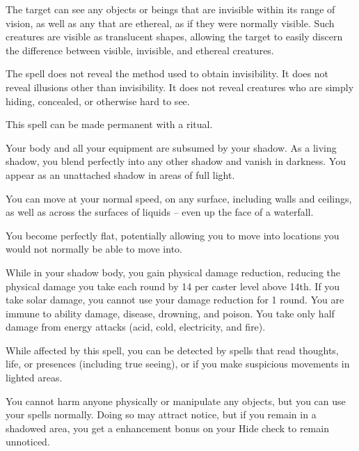 \begin{spellheader}
    \spelldur{\durlong \dismissable}
\end{spellheader}
\begin{spelleffects}
    \spelleffect The target can see any objects or beings that are invisible within its range of vision, as well as any that are ethereal, as if they were normally visible. Such creatures are visible as translucent shapes, allowing the target to easily discern the difference between visible, invisible, and ethereal creatures.
\end{spelleffects}
\begin{spellfooter}
    \spellnotes The spell does not reveal the method used to obtain invisibility. It does not reveal illusions other than invisibility. It does not reveal creatures who are simply hiding, concealed, or otherwise hard to see.

    This spell can be made permanent with a  ritual.
\end{spellfooter}

\begin{spellheader}
    \spelldur{\durmed \dismissable}
\end{spellheader}
\begin{spelleffects}
    \spelleffect Your body and all your equipment are subsumed by your shadow. As a living shadow, you blend perfectly into any other shadow and vanish in darkness. You appear as an unattached shadow in areas of full light.
    \par You can move at your normal speed, on any surface, including walls and ceilings, as well as across the surfaces of liquids -- even up the face of a waterfall.
    \par You become perfectly flat, potentially allowing you to move into locations you would not normally be able to move into.
    \par While in your shadow body, you gain physical damage reduction, reducing the physical damage you take each round by 14  per caster level above 14th. If you take solar damage, you cannot use your damage reduction for 1 round. You are immune to ability damage, disease, drowning, and poison. You take only half damage from energy attacks (acid, cold, electricity, and fire).
    \par While affected by this spell, you can be detected by spells that read thoughts, life, or presences (including true seeing), or if you make suspicious movements in lighted areas.
    \par You cannot harm anyone physically or manipulate any objects, but you can use your spells normally. Doing so may attract notice, but if you remain in a shadowed area, you get a  enhancement bonus on your Hide check to remain unnoticed.
\end{spelleffects}
\begin{spellfooter}

\end{spellfooter}

